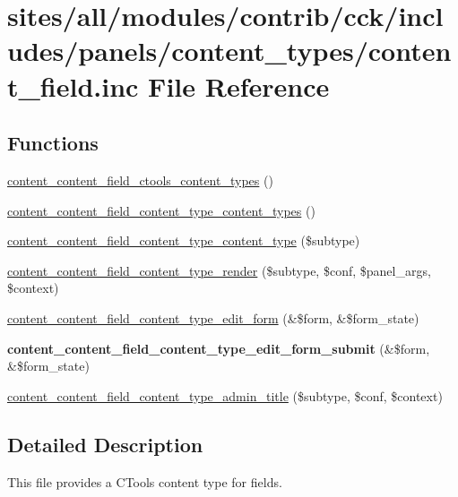 \hypertarget{content__field_8inc}{
\section{sites/all/modules/contrib/cck/includes/panels/content\_\-types/content\_\-field.inc File Reference}
\label{content__field_8inc}
}
\subsection*{Functions}
\begin{CompactItemize}
\item 
\hyperlink{content__field_8inc_eccf10c30b3cac5fdc4e7cf6edd832fd}{content\_\-content\_\-field\_\-ctools\_\-content\_\-types} ()
\item 
\hyperlink{content__field_8inc_ce193b46260a22dbea7f033805ba6e7d}{content\_\-content\_\-field\_\-content\_\-type\_\-content\_\-types} ()
\item 
\hyperlink{content__field_8inc_088097e7bf301073fd54ed08020812a8}{content\_\-content\_\-field\_\-content\_\-type\_\-content\_\-type} (\$subtype)
\item 
\hyperlink{content__field_8inc_979d19ca8a7bbc19224856d4f97a733b}{content\_\-content\_\-field\_\-content\_\-type\_\-render} (\$subtype, \$conf, \$panel\_\-args, \$context)
\item 
\hyperlink{content__field_8inc_977a3ade87db904419cc1c2230a57e25}{content\_\-content\_\-field\_\-content\_\-type\_\-edit\_\-form} (\&\$form, \&\$form\_\-state)
\item 
\hypertarget{content__field_8inc_afbb2aeaa50f2394c5c5611a165f51d1}{
\textbf{content\_\-content\_\-field\_\-content\_\-type\_\-edit\_\-form\_\-submit} (\&\$form, \&\$form\_\-state)}
\label{content__field_8inc_afbb2aeaa50f2394c5c5611a165f51d1}

\item 
\hyperlink{content__field_8inc_cbe550b74a9f2f7158e87ec726115f0d}{content\_\-content\_\-field\_\-content\_\-type\_\-admin\_\-title} (\$subtype, \$conf, \$context)
\end{CompactItemize}


\subsection{Detailed Description}
This file provides a CTools content type for fields. 

